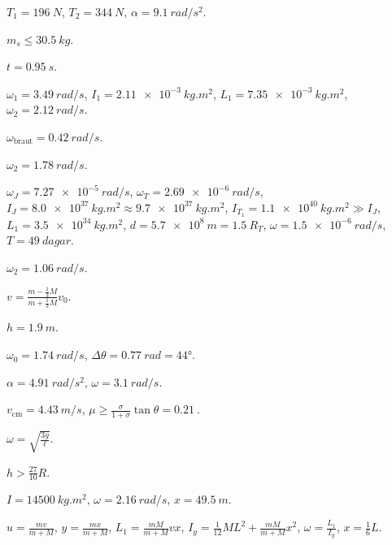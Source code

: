 \ifdefined \wholebook \else\documentclass[oneside]{book}\usepackage{EdlBook}\graphicspath{{figures/}}
\begin{document}
\begin{enumerate*}[label = \vspace{0.15cm} \textbf{(\arabic*)}]
  \item $T_1 = \SI{196}{N}$, $T_2 = \SI{344}{N}$, $\alpha = \SI{9.1}{rad/s^2}$.
  \item $m_s \leq \SI{30.5}{kg}$.
  \item $t = \SI{0.95}{s}$.
  \item $\omega_1 = \SI{3.49}{rad/s}$, $I_1 = \SI{2.11e-3}{kg.m^2}$, $L_1 = \SI{7.35e-3}{kg.m^2}$, $\omega_2 = \SI{2.12}{rad/s}$.
  \item $\omega_{\text{braut}} = \SI{0.42}{rad/s}$.
  \item $\omega_2 = \SI{1.78}{rad/s}$.
  \item $\omega_J = \SI{7.27e-5}{rad/s}$, $\omega_T = \SI{2.69e-6}{rad/s}$, $I_J = \SI{8.0e37}{kg.m^2} \approx \SI{9.7e37}{kg.m^2}$, $I_{T_{1}} = \SI{1.1e40}{kg.m^2} \gg I_J$, $L_1 = \SI{3.5e34}{kg.m^2}$, $d = \SI{5.7e8}{m} = \SI{1.5}{}R_T$, $\omega = \SI{1.5e-6}{rad/s}$, $T = \SI{49}{dagar}$.
  \item $\omega_2 = \SI{1.06}{rad/s}$.
  \item $v = \frac{m-\frac{1}{3}M}{m+\frac{1}{3}M}v_0$.
  \item $h = \SI{1.9}{m}$.
  \item $\omega_0 = \SI{1.74}{rad/s}$, $\Delta \theta = \SI{0.77}{rad} = \ang{44}$.
  \item $\alpha = \SI{4.91}{rad/s^2}$, $\omega = \SI{3.1}{rad/s}$.
  \item $v_{\text{cm}} = \SI{4.43}{m/s}$, $\mu \geq \frac{\sigma}{1+\sigma}\tan\theta = \SI{0.21}{}$.
  \item $\omega = \sqrt{\frac{3g}{\ell}}$. \item $h > \frac{27}{10}R$.
  \item $I = \SI{14500}{kg.m^2}$, $\omega = \SI{2.16}{rad/s}$, $x = \SI{49.5}{m}$.
  \item $u = \frac{mv}{m+M}$, $y = \frac{mx}{m+M}$, $L_1 = \frac{mM}{m+M}vx$, $I_y = \frac{1}{12}ML^2 + \frac{mM}{m+M}x^2$, $\omega = \frac{L_1}{I_y}$, $x = \frac{1}{6}L$.
\end{enumerate*}





\ifdefined \wholebook \else
 \printindex
\end{document}
